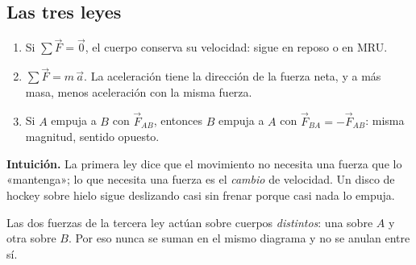 \documentclass[11pt,a4paper]{article}
\begin{document}
\subsection{Las tres leyes}
\begin{propiedad}
\begin{enumerate}[label=\textbf{\arabic*.},leftmargin=1.6em]
\item {} Si $\sum\vec F=\vec 0$, el cuerpo conserva su velocidad: sigue en reposo o en MRU.
\item {} $\displaystyle\sum\vec F=m\,\vec a$. La aceleración tiene la dirección de la fuerza neta,
      y a más masa, menos aceleración con la misma fuerza.
\item {} Si $A$ empuja a $B$ con $\vec F_{AB}$, entonces $B$ empuja a $A$ con
      $\vec F_{BA}=-\vec F_{AB}$: misma magnitud, sentido opuesto.
\end{enumerate}
\end{propiedad}
\textbf{Intuición.} La primera ley dice que el movimiento no necesita una fuerza que lo «mantenga»; lo que necesita
una fuerza es el \emph{cambio} de velocidad. Un disco de hockey sobre hielo sigue deslizando casi sin frenar
porque casi nada lo empuja.

\begin{minipage}[c]{0.52\linewidth}
\begin{ojo}
Las dos fuerzas de la tercera ley actúan sobre cuerpos \emph{distintos}: una sobre $A$ y otra sobre $B$.
Por eso nunca se suman en el mismo diagrama y no se anulan entre sí.
\end{ojo}
\end{minipage}\hfill
\begin{minipage}[c]{0.44\linewidth}\centering
{}
\end{minipage}
\end{document}
